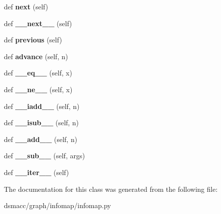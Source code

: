 \begin{DoxyCompactItemize}
def {\bfseries next} (self)
\item 
\mbox{\label{classdsmacc_1_1graph_1_1infomap_1_1infomap_1_1SwigPyIterator_ad19553252b97dc4ade67325e48c51a16}} 
def {\bfseries \+\_\+\+\_\+next\+\_\+\+\_\+} (self)
\item 
\mbox{\label{classdsmacc_1_1graph_1_1infomap_1_1infomap_1_1SwigPyIterator_add7d28faa4db2734ebc1f79e057625b8}} 
def {\bfseries previous} (self)
\item 
\mbox{\label{classdsmacc_1_1graph_1_1infomap_1_1infomap_1_1SwigPyIterator_aca586774d9b27a63813285ee5d73f3d4}} 
def {\bfseries advance} (self, n)
\item 
\mbox{\label{classdsmacc_1_1graph_1_1infomap_1_1infomap_1_1SwigPyIterator_a1d3c1a3d90490195168ba4be90fe0295}} 
def {\bfseries \+\_\+\+\_\+eq\+\_\+\+\_\+} (self, x)
\item 
\mbox{\label{classdsmacc_1_1graph_1_1infomap_1_1infomap_1_1SwigPyIterator_a5b11669e73f0eccef50a905819dd9f6f}} 
def {\bfseries \+\_\+\+\_\+ne\+\_\+\+\_\+} (self, x)
\item 
\mbox{\label{classdsmacc_1_1graph_1_1infomap_1_1infomap_1_1SwigPyIterator_a09d95600de7ab8ab393f5075d6d34374}} 
def {\bfseries \+\_\+\+\_\+iadd\+\_\+\+\_\+} (self, n)
\item 
\mbox{\label{classdsmacc_1_1graph_1_1infomap_1_1infomap_1_1SwigPyIterator_ae97c6458467336b050265773d2e62004}} 
def {\bfseries \+\_\+\+\_\+isub\+\_\+\+\_\+} (self, n)
\item 
\mbox{\label{classdsmacc_1_1graph_1_1infomap_1_1infomap_1_1SwigPyIterator_aaae16ca87c9dbe53a08f819a9318f6f4}} 
def {\bfseries \+\_\+\+\_\+add\+\_\+\+\_\+} (self, n)
\item 
\mbox{\label{classdsmacc_1_1graph_1_1infomap_1_1infomap_1_1SwigPyIterator_ad19f44c61025e88b0784809d4b10a6fc}} 
def {\bfseries \+\_\+\+\_\+sub\+\_\+\+\_\+} (self, args)
\item 
\mbox{\label{classdsmacc_1_1graph_1_1infomap_1_1infomap_1_1SwigPyIterator_aa3f43e2cbd529ab674fea990a6524a60}} 
def {\bfseries \+\_\+\+\_\+iter\+\_\+\+\_\+} (self)
\end{DoxyCompactItemize}


The documentation for this class was generated from the following file\+:\begin{DoxyCompactItemize}
\item 
dsmacc/graph/infomap/infomap.\+py\end{DoxyCompactItemize}
